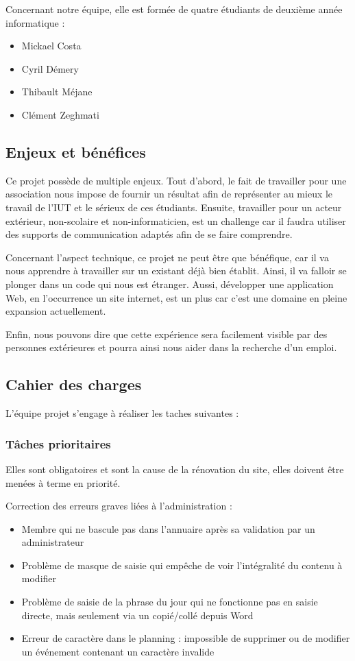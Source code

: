 \documentclass[11pt]{report}
\begin{document}
\par Concernant notre équipe, elle est formée de quatre étudiants de deuxième 
année informatique : 
\begin{itemize}
    \item Mickael Costa
    \item Cyril Démery
    \item Thibault Méjane
    \item Clément Zeghmati
\end{itemize}


\subsection{Enjeux et bénéfices}
Ce projet possède de multiple enjeux. Tout d'abord, le fait de travailler pour 
une association nous impose de fournir un résultat afin de représenter au mieux 
le travail de l'IUT et le sérieux de ces étudiants. Ensuite, travailler pour 
un acteur extérieur, non-scolaire et non-informaticien, est un challenge car il 
faudra utiliser des supports de communication adaptés afin de se faire 
comprendre. \\

\par Concernant l'aspect technique, ce projet ne peut être que bénéfique, car 
il 
va nous apprendre à travailler sur un existant déjà bien établit. Ainsi, il va 
falloir se plonger dans un code qui nous est étranger. Aussi, développer une 
application Web, en l’occurrence un site internet, est un plus car c'est une 
domaine en pleine expansion actuellement.\\

\par Enfin, nous pouvons dire que cette expérience sera facilement visible par 
des personnes extérieures et pourra ainsi nous aider dans la recherche d'un 
emploi.
\subsection{Cahier des charges}
L'équipe projet s'engage à réaliser les taches suivantes :
\subsubsection*{Tâches prioritaires}
Elles sont obligatoires et sont la cause de la rénovation du site, elles doivent être menées à terme en priorité. 

Correction des erreurs graves liées à l'administration :
\begin{itemize}
\item Membre qui ne bascule pas dans l'annuaire après sa validation par un
administrateur
\item Problème de masque de saisie qui empêche de voir l'intégralité du contenu
à modifier 
\item Problème de saisie de la phrase du jour qui ne fonctionne pas en saisie
directe, mais seulement via un copié/collé depuis Word
\item Erreur de caractère dans le planning : impossible de supprimer ou de
modifier un événement contenant un caractère invalide
\end{itemize}
\end{document}
